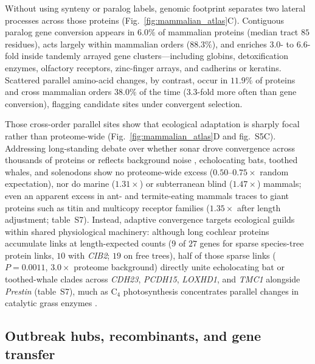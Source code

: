 \documentclass[12pt]{article}
\begin{document}
Without using synteny or paralog labels, genomic footprint separates two lateral processes across those proteins (Fig.~\ref{fig:mammalian_atlas}C). Contiguous paralog gene conversion appears in $6.0\%$ of mammalian proteins (median tract $85$ residues), acts largely within mammalian orders ($88.3\%$), and enriches $3.0$- to $6.6$-fold inside tandemly arrayed gene clusters---including globins, detoxification enzymes, olfactory receptors, zinc-finger arrays, and cadherins or keratins. Scattered parallel amino-acid changes, by contrast, occur in $11.9\%$ of proteins and cross mammalian orders $38.0\%$ of the time ($3.3$-fold more often than gene conversion), flagging candidate sites under convergent selection.

Those cross-order parallel sites show that ecological adaptation is sharply focal rather than proteome-wide (Fig.~\ref{fig:mammalian_atlas}D and fig.~S5C). Addressing long-standing debate over whether sonar drove convergence across thousands of proteins \cite{parker2013genome} or reflects background noise \cite{zou2015no,thomas2015molecular}, echolocating bats, toothed whales, and solenodons show no proteome-wide excess ($0.50$--$0.75\times$ random expectation), nor do marine ($1.31\times$) or subterranean blind ($1.47\times$) mammals; even an apparent excess in ant- and termite-eating mammals traces to giant proteins such as titin and multicopy receptor families ($1.35\times$ after length adjustment; table~S7). Instead, adaptive convergence targets ecological guilds within shared physiological machinery: although long cochlear proteins accumulate links at length-expected counts ($9$ of $27$ genes for sparse species-tree protein links, $10$ with \textit{CIB2}; $19$ on free trees), half of those sparse links ($P = 0.0011$, $3.0\times$ proteome background) directly unite echolocating bat or toothed-whale clades across \textit{CDH23}, \textit{PCDH15}, \textit{LOXHD1}, and \textit{TMC1} alongside \textit{Prestin} (table~S7), much as $\mathrm{C}_4$ photosynthesis concentrates parallel changes in catalytic grass enzymes \cite{christin2012adaptive}.

\subsection*{Outbreak hubs, recombinants, and gene transfer}
\end{document}
